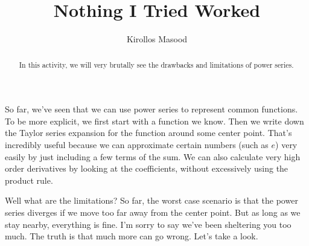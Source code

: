 \documentclass{ximera}
\title{Nothing I Tried Worked}
\author{Kirollos Masood}
\begin{document}
\begin{abstract}
In this activity, we will very brutally see the drawbacks and limitations of power series.
\end{abstract}
\maketitle

So far, we've seen that we can use power series to represent common functions. To be more explicit, we first start with a function we know. Then we write down the Taylor series expansion for the function around some center point. That's incredibly useful because we can approximate certain numbers (such as $e$) very easily by just including a few terms of the sum. We can also calculate very high order derivatives by looking at the coefficients, without excessively using the product rule.

Well what are the limitations? So far, the worst case scenario is that the power series diverges if we move too far away from the center point. But as long as we stay nearby, everything is fine. I'm sorry to say we've been sheltering you too much. The truth is that much more can go wrong. Let's take a look.
\end{document}
